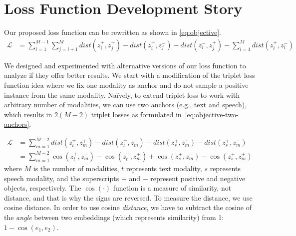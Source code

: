 
\section{Loss Function Development Story}


Our proposed \geom{} loss function can be rewritten as shown in \cref{eq:objective}.
\begin{equation}\label{eq:objective}
\begin{split}
    \mathcal{L}  &= \sum_{i=1}^{M-1} \sum_{j=i+1}^{M} dist( z_{i}^{+} , z_{j}^{+}) 
     - dist( z_{i}^{+} , z_{j}^{-}) - dist( z_{i}^{-} , z_{j}^{+}) - \sum_{i=1}^{M} dist( z_{i}^{+} , z_{i}^{-} )
\end{split}
\end{equation}


We designed and experimented with alternative versions of our \geom{} loss function to analyze if they offer better results.
We start with a modification of the triplet loss function idea where we fix one modality as anchor and do not sample a positive instance from the same modality. 
Na\"ively, to extend triplet loss to work with arbitrary number of modalities, we can use two anchors (e.g., text and speech), which results in $2(M-2)$ triplet losses as formulated in~\cref{eq:objective-two-anchors}. 


\begin{equation}
\label{eq:objective-two-anchors}
\begin{split}
    \mathcal{L}  &= \sum_{m=1}^{M-2} dist( z_{t}^{+} , z_{m}^{+} ) - dist( z_{t}^{+} , z_{m}^{-} ) + dist( z_{s}^{+} , z_{m}^{+} ) - dist( z_{s}^{+} , z_{m}^{-} ) \\
    &= \sum_{m=1}^{M-2} \cos(z_{t}^{+} ,z_{m}^{-}) - \cos(z_{t}^{+}, z_{m}^{+}) + \cos(z_{s}^{+} ,z_{m}^{-}) - \cos(z_{s}^{+}, z_{m}^{+})
\end{split}
\end{equation}
where $M$ is the number of modalities, $t$ represents text modality, $s$ represents speech modality, and the superscripts $+$ and $-$ represent positive and negative objects, respectively.
The $\cos(\cdot)$ function is a measure of similarity, not distance, and that is why the signs are reversed. To measure the distance, we use cosine distance.
In order to use cosine \textit{distance}, we have to subtract the cosine of the \textit{angle} between two embeddings (which represents similarity) from 1: $1 - \cos(e_1, e_2)$.

